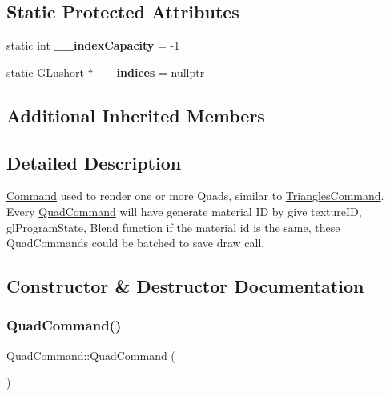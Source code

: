 \subsection*{Static Protected Attributes}
\begin{DoxyCompactItemize}
\item 
\mbox{\label{classQuadCommand_a0bf7a39dc66e662b3cc30fe664838358}} 
static int {\bfseries \+\_\+\+\_\+index\+Capacity} = -\/1
\item 
\mbox{\label{classQuadCommand_a604021082abd1c850a6f96f4738ca5d5}} 
static G\+Lushort $\ast$ {\bfseries \+\_\+\+\_\+indices} = nullptr
\end{DoxyCompactItemize}
\subsection*{Additional Inherited Members}


\subsection{Detailed Description}
\hyperlink{classCommand}{Command} used to render one or more Quads, similar to \hyperlink{classTrianglesCommand}{Triangles\+Command}. Every \hyperlink{classQuadCommand}{Quad\+Command} will have generate material ID by give texture\+ID, gl\+Program\+State, Blend function if the material id is the same, these Quad\+Commands could be batched to save draw call. 

\subsection{Constructor \& Destructor Documentation}
\mbox{\label{classQuadCommand_a54d0771b603ab1c094405d093d625f7b}} 
\subsubsection{\texorpdfstring{Quad\+Command()}{QuadCommand()}\hspace{0.1cm}{\footnotesize\ttfamily [1/2]}}
{\footnotesize\ttfamily Quad\+Command\+::\+Quad\+Command (\begin{DoxyParamCaption}{ }\end{DoxyParamCaption})}

